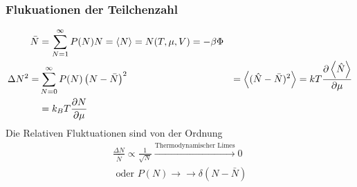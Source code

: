 \subsubsection*{Flukuationen der Teilchenzahl}
%
\begin{align*}
  \bar{N} &  = \sum_{N = 1}^{ \infty} P(N) N  = \Braket{N} = 
  N(T, \mu, V) = -\beta \Phi \\
  \Delta N^2 = &  \sum_{N=0}^{ \infty} P(N) \left( N- \bar{N} \right)^2 
  & =  \Braket{(\hat{N} - \bar{N})^2} = k T \frac{\partial \Braket{\hat{N}} }{\partial \mu} \\ &  = 
  k_B T \frac{\partial N }{\partial \mu}
\end{align*}
%
Die Relativen Fluktuationen sind von der Ordnung 
%
\begin{align*}
  \frac{\Delta{}N}{\bar{N}} \propto \frac{1}{\sqrt{N}} 
  \xrightarrow{\text{Thermodynamischer Limes}} 0  \\
  \text{ oder } P(N) \xrightarrow{ } \to \delta(N - \bar{N})
\end{align*}
%
